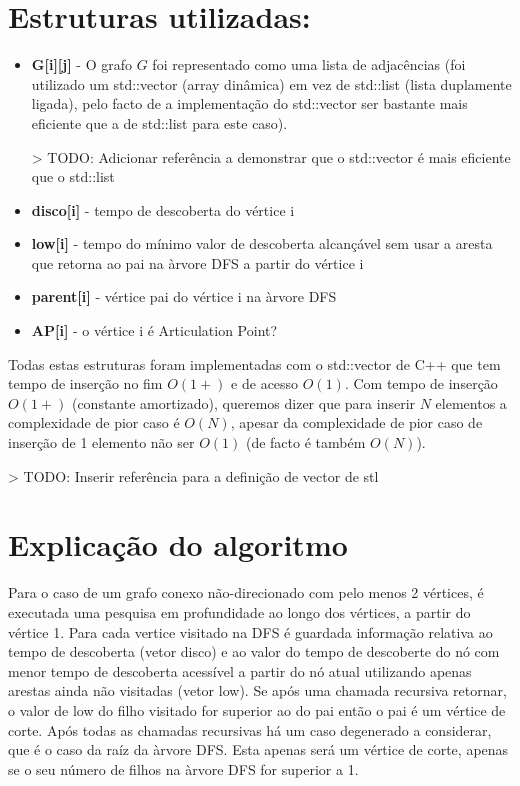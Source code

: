 \documentclass{scrartcl}
\begin{document}
\section*{Estruturas utilizadas:}
\begin{itemize}
\item \textbf{G[i][j]} - O grafo $G$ foi representado como uma lista de adjacências (foi utilizado um std::vector (array dinâmica) em vez de std::list (lista duplamente ligada), pelo facto de a implementação do std::vector ser bastante mais eficiente que a de std::list para este caso). 

> TODO: Adicionar referência a demonstrar que o std::vector é mais eficiente que o std::list
\item \textbf{disco[i]} - tempo de descoberta do vértice i
\item \textbf{low[i]} - tempo do mínimo valor de descoberta alcançável sem usar a aresta que retorna ao pai na àrvore DFS a partir do vértice i
\item \textbf{parent[i]} - vértice pai do vértice i na àrvore DFS
\item \textbf{AP[i]} - o vértice i é Articulation Point?
\end{itemize}
Todas estas estruturas foram implementadas com o std::vector de C++ que tem tempo de inserção no fim $O(1+)$ e de acesso $O(1)$. Com tempo de inserção $O(1+)$ (constante amortizado), queremos dizer que para inserir $N$ elementos a complexidade de pior caso é $O(N)$, apesar da complexidade de pior caso de inserção de 1 elemento não ser $O(1)$ (de facto é também $O(N)$).

> TODO: Inserir referência para a definição de vector de stl
\section*{Explicação do algoritmo}
 Para o caso de um grafo conexo não-direcionado com pelo menos 2 vértices, é executada uma pesquisa em profundidade ao longo dos vértices, a partir do vértice 1. Para cada vertice visitado na DFS é guardada informação relativa ao tempo de descoberta (vetor disco) e ao valor do tempo de descoberte do nó com menor tempo de descoberta acessível a partir do nó atual utilizando apenas arestas ainda não visitadas (vetor low). Se após uma chamada recursiva retornar, o valor de low do filho visitado for superior ao do pai então o pai é um vértice de corte.
Após todas as chamadas recursivas há um caso degenerado a considerar, que é o caso da raíz da àrvore DFS. Esta apenas será um vértice de corte, apenas se o seu número de filhos na àrvore DFS for superior a 1.
\end{document}
